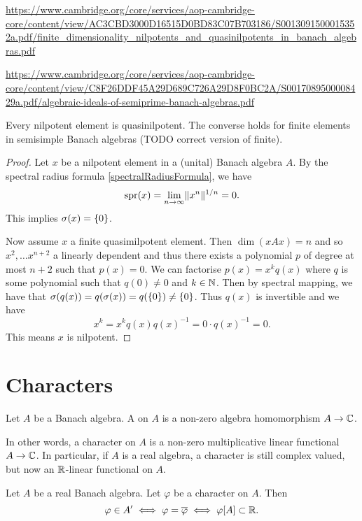 \url{https://www.cambridge.org/core/services/aop-cambridge-core/content/view/AC3CBD3000D16515D0BD83C07B703186/S0013091500015352a.pdf/finite_dimensionality_nilpotents_and_quasinilpotents_in_banach_algebras.pdf}

\url{https://www.cambridge.org/core/services/aop-cambridge-core/content/view/C8F26DDF45A29D689C726A29D8F0BC2A/S0017089500008429a.pdf/algebraic-ideals-of-semiprime-banach-algebras.pdf}

\begin{proposition} \label{nilpotentQuasinilpotent}
Every nilpotent element is quasinilpotent. The converse holds for finite elements in semisimple Banach algebras (TODO correct version of finite).
\end{proposition}
\begin{proof}
Let $x$ be a nilpotent element in a (unital) Banach algebra $A$.
By the spectral radius formula \ref{spectralRadiusFormula}, we have
\[ \operatorname{spr}(x) = \lim_{n\to\infty}\lVert x^n\rVert^{1/n} = 0. \]
This implies $\sigma(x) = \{0\}$.

Now assume $x$ a finite quasimilpotent element. Then $\dim(xAx) = n$ and so $x^2, \ldots x^{n+2}$ a linearly dependent and thus there exists a polynomial $p$ of degree at most $n+2$ such that $p(x) = 0$. We can factorise $p(x) = x^kq(x)$ where $q$ is some polynomial such that $q(0) \neq 0$ and $k\in \mathbb{N}$. Then by spectral mapping, we have that $\sigma(q(x)) = q(\sigma(x)) = q(\{0\}) \neq \{0\}$. Thus $q(x)$ is invertible and we have
\[ x^k = x^kq(x)q(x)^{-1} = 0\cdot q(x)^{-1} = 0. \]
This means $x$ is nilpotent.
\end{proof}

\section{Characters}
\begin{definition}
Let $A$ be a Banach algebra. A  on $A$ is a non-zero algebra homomorphism $A\to\mathbb{C}$.
\end{definition}
In other words, a character on $A$ is a non-zero multiplicative linear functional $A\to \mathbb{C}$.
In particular, if $A$ is a real algebra, a character is still complex valued, but now  an $\mathbb{R}$-linear functional on $A$. 

\begin{lemma}
Let $A$ be a real Banach algebra. Let $\varphi$ be a character on $A$. Then
\[ \varphi \in {A}^\prime \iff \varphi = \overline{\varphi} \iff \varphi[A] \subset \mathbb{R}. \]
\end{lemma}

